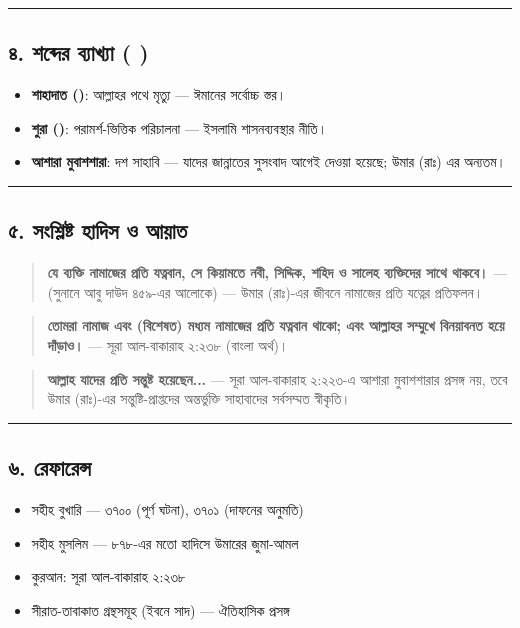 \medskip\hrule\medskip

\subsection*{৪. শব্দের ব্যাখ্যা ( )}

\begin{itemize}
\item \textbf{শাহাদাত ()}: আল্লাহর পথে মৃত্যু — ঈমানের সর্বোচ্চ স্তর।
\item \textbf{শুরা ()}: পরামর্শ-ভিত্তিক পরিচালনা — ইসলামি শাসনব্যবস্থার নীতি।
\item \textbf{আশারা মুবাশশারা}: দশ সাহাবি — যাদের জান্নাতের সুসংবাদ আগেই দেওয়া হয়েছে; উমার (রাঃ) এর অন্যতম।
\end{itemize}
\medskip\hrule\medskip

\subsection*{৫. সংশ্লিষ্ট হাদিস ও আয়াত}

\begin{quote}
\textbf{যে ব্যক্তি নামাজের প্রতি যত্নবান, সে কিয়ামতে নবী, সিদ্দিক, শহিদ ও সালেহ ব্যক্তিদের সাথে থাকবে।} — (সুনানে আবু দাউদ ৪৫৯-এর আলোকে) — উমার (রাঃ)-এর জীবনে নামাজের প্রতি যত্নের প্রতিফলন।
\end{quote}

\begin{quote}
\textbf{তোমরা নামাজ এবং (বিশেষত) মধ্যম নামাজের প্রতি যত্নবান থাকো; এবং আল্লাহর সম্মুখে বিনয়াবনত হয়ে দাঁড়াও।} — সূরা আল-বাকারাহ ২:২৩৮ (বাংলা অর্থ)।
\end{quote}

\begin{quote}
\textbf{আল্লাহ যাদের প্রতি সন্তুষ্ট হয়েছেন...} — সূরা আল-বাকারাহ ২:২২৩-এ আশারা মুবাশশারার প্রসঙ্গ নয়, তবে উমার (রাঃ)-এর সন্তুষ্টি-প্রাপ্তদের অন্তর্ভুক্তি সাহাবাদের সর্বসম্মত স্বীকৃতি।
\end{quote}

\medskip\hrule\medskip

\subsection*{৬. রেফারেন্স}

\begin{itemize}
\item সহীহ বুখারি — ৩৭০০ (পূর্ণ ঘটনা), ৩৭০১ (দাফনের অনুমতি)
\item সহীহ মুসলিম — ৮৭৮-এর মতো হাদিসে উমারের জুমা-আমল
\item কুরআন: সূরা আল-বাকারাহ ২:২৩৮
\item সীরাত-তাবাকাত গ্রন্থসমূহ (ইবনে সাদ) — ঐতিহাসিক প্রসঙ্গ
\end{itemize}


